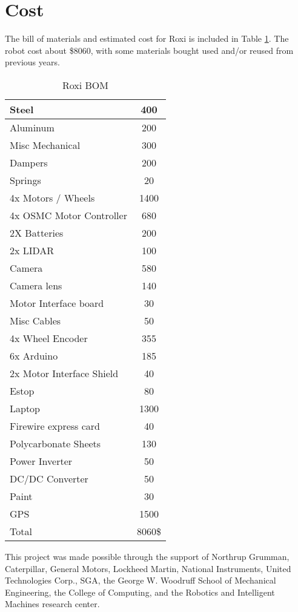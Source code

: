 \section{Cost}

The bill of materials and estimated cost for Roxi is included in Table \ref{TAB:Cost}. The robot cost about \$8060, with some materials bought used and/or reused from previous years.

\begin{table}[H]
\begin{center}
\caption{Roxi BOM}
\begin{tabular}{| l | c |}
\hline

Steel	&	400\\	\hline
Aluminum	&	200\\	\hline
Misc Mechanical	&	300\\	\hline
Dampers	&	200\\	\hline
Springs	&	20\\	\hline
4x Motors / Wheels	&	1400\\	\hline
4x OSMC Motor Controller	&	680\\	\hline
2X Batteries & 200\\ \hline
2x LIDAR	&	100\\	\hline
Camera	&	580\\	\hline
Camera lens	&	140\\	\hline
Motor Interface board	&	30\\	\hline
Misc Cables	&	50\\	\hline
4x Wheel Encoder	&	355\\	\hline
6x Arduino	&	185\\	\hline
2x Motor Interface Shield	&	40\\	\hline
Estop	&	80\\	\hline
Laptop	&	1300\\	\hline
Firewire express card	&	40\\	\hline
Polycarbonate Sheets	&	130\\	\hline
Power Inverter	&	50\\	\hline
DC/DC Converter	&	50\\	\hline
Paint	&	30\\	\hline
GPS	&	1500\\	\hline
Total	&	8060\$\\	
\hline


\end{tabular}
\label{TAB:Cost}
\end{center}
\end{table}

This project was made possible through the support of Northrup Grumman, Caterpillar, General Motors, Lockheed Martin, National Instruments, United Technologies Corp., SGA, the George W. Woodruff School of Mechanical Engineering, the College of Computing, and the  Robotics and Intelligent Machines research center.
